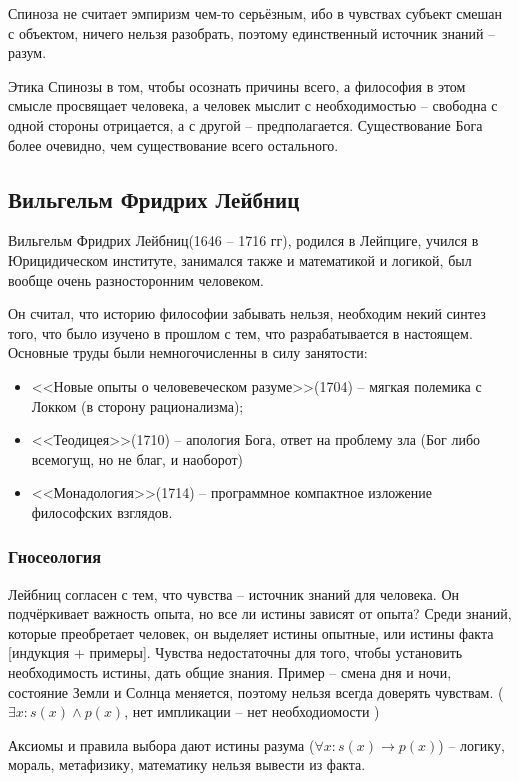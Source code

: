 \documentclass[a4paper, 12pt]{book} %
\begin{document}
Спиноза не считает эмпиризм чем-то серьёзным, ибо в чувствах субъект смешан с объектом, ничего нельзя разобрать, поэтому единственный источник знаний -- разум. 

Этика Спинозы в том, чтобы осознать причины всего, а философия в этом смысле просвящает человека, а человек мыслит с необходимостью -- свободна с одной стороны отрицается, а с другой -- предполагается. Существование Бога более очевидно, чем существование всего остального.

\subsection{Вильгельм Фридрих Лейбниц}
Вильгельм Фридрих Лейбниц(1646 -- 1716 гг), родился в Лейпциге, учился в Юрицидическом институте, занимался также и математикой и логикой, был вообще очень разносторонним человеком.

Он считал, что историю философии забывать нельзя, необходим некий синтез того, что было изучено в прошлом с тем, что разрабатывается в настоящем.
Основные труды были немногочисленны в силу занятости:
\begin{itemize}
\item <<Новые опыты о человевеческом разуме>>(1704) -- мягкая полемика с Локком (в сторону рационализма);
\item <<Теодицея>>(1710) -- апология Бога, ответ на проблему зла (Бог либо всемогущ, но не благ, и наоборот)
\item <<Монадология>>(1714) -- программное компактное изложение философских взглядов.
\end{itemize}  

\subsubsection{Гносеология}
Лейбниц согласен с тем, что чувства -- источник знаний для человека.
Он подчёркивает важность опыта, но все ли истины зависят от опыта? Среди знаний, которые преобретает человек, он выделяет истины опытные, или истины факта [индукция + примеры]. Чувства недостаточны для того, чтобы установить необходимость истины, дать общие знания. Пример -- смена дня и ночи, состояние Земли и Солнца меняется, поэтому нельзя всегда доверять чувствам. ($\exists x: s(x) \wedge p(x)$, нет импликации -- нет необходиомости )

Аксиомы и правила выбора дают истины разума ($\forall x: s(x) \rightarrow p(x)$) -- логику, мораль, метафизику, математику нельзя вывести из факта.
\end{document}
